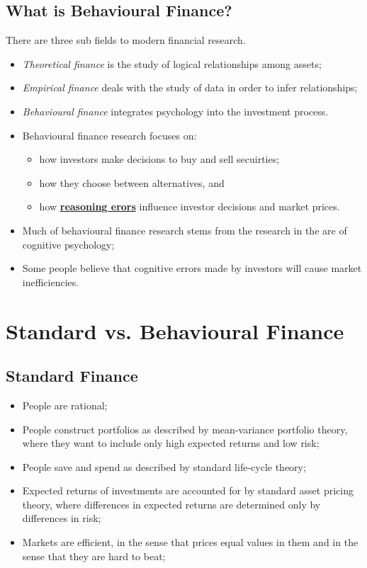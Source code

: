 \documentclass[11pt,a4paper]{report}
\begin{document}
\subsection{What is Behavioural Finance?}
There are three sub fields to modern financial research.
\begin{itemize}
    \item \textit{Theoretical finance} is the study of logical relationships among assets;
    \item \textit{Empirical finance} deals with the study of data in order to infer relationships;
    \item \textit{Behavioural finance} integrates psychology into the investment process.
\end{itemize}
\begin{itemize}
    \item Behavioural finance research focuses on:
    \begin{itemize}
        \item how investors make decisions to buy and sell secuirties;
        \item how they choose between alternatives, and
        \item how \textbf{\underline{reasoning erors}} influence investor decisions and market prices.
    \end{itemize}
    \item Much of behavioural finance research stems from the research in the are of cognitive psychology;
    \item Some people believe that cognitive errors made by investors will cause market inefficiencies.
\end{itemize}
\section{Standard vs. Behavioural Finance}
\subsection{Standard Finance}
\begin{itemize}
    \item People are rational;
    \item People construct portfolios as described by mean-variance portfolio theory, where they want to include only high expected returns and low risk;
    \item People save and spend as described by standard life-cycle theory;
    \item Expected returns of investments are accounted for by standard asset pricing theory, where differences in expected returns are determined only by differences in risk;
    \item Markets are efficient, in the sense that prices equal values in them and in the sense that they are hard to beat;
\end{itemize}
\end{document}

